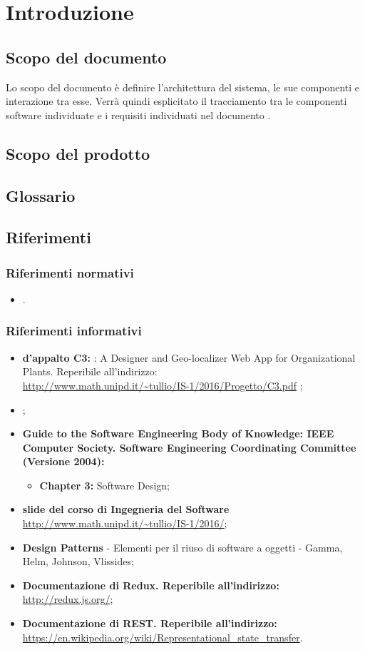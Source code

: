 \newpage
\section{Introduzione}
	\subsection {Scopo del documento}
	Lo scopo del documento è definire l'architettura del sistema, le sue componenti e interazione tra esse. Verrà quindi esplicitato il tracciamento tra le componenti software individuate e i requisiti individuati nel documento \adrv.
	\subsection {Scopo del prodotto}
	\introScopo
	\subsection {Glossario}
	\introGlossario
	\subsection {Riferimenti}
	\subsubsection{Riferimenti normativi}
	\begin{itemize}
		\item \ndpv.
	\end{itemize}
	\subsubsection{Riferimenti informativi}
	\begin{itemize}
		\item \textbf{ d'appalto C3:} \progetto: A Designer and Geo-localizer Web App for Organizational Plants. Reperibile all'indirizzo:\\ \url{http://www.math.unipd.it/~tullio/IS-1/2016/Progetto/C3.pdf} ;
		\item \adrv;
		\item \textbf{Guide to the Software Engineering Body of Knowledge: IEEE Computer Society. Software Engineering Coordinating Committee (Versione 2004):}
		\begin{itemize}
			\item \textbf{Chapter 3:} Software Design;
		\end{itemize}
		\item \textbf{slide del corso di Ingegneria del Software}\\
		\url{http://www.math.unipd.it/~tullio/IS-1/2016/};
		\item \textbf{Design Patterns} - Elementi per il riuso di software a oggetti - Gamma, Helm, Johnson, Vlissides;
		\item \textbf{Documentazione di Redux. Reperibile all'indirizzo: \\}\url{http://redux.js.org/};
			\item \textbf{Documentazione di REST. Reperibile all'indirizzo: \\}\url{https://en.wikipedia.org/wiki/Representational_state_transfer}.
	\end{itemize}
